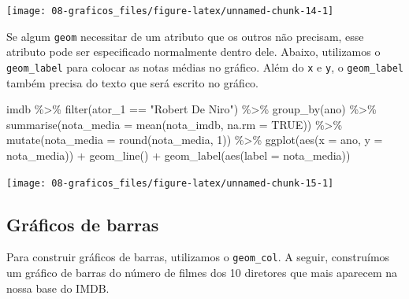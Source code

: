 \documentclass[
]{book}
\newenvironment{Shaded}{\begin{snugshade}}{\end{snugshade}}
\newcommand{\AttributeTok}[1]{\textcolor[rgb]{0.77,0.63,0.00}{#1}}
\newcommand{\ConstantTok}[1]{\textcolor[rgb]{0.00,0.00,0.00}{#1}}
\newcommand{\DecValTok}[1]{\textcolor[rgb]{0.00,0.00,0.81}{#1}}
\newcommand{\FunctionTok}[1]{\textcolor[rgb]{0.00,0.00,0.00}{#1}}
\newcommand{\NormalTok}[1]{#1}
\newcommand{\SpecialCharTok}[1]{\textcolor[rgb]{0.00,0.00,0.00}{#1}}
\newcommand{\StringTok}[1]{\textcolor[rgb]{0.31,0.60,0.02}{#1}}
\begin{document}
\begin{center}\texttt{[image: 08-graficos\_files/figure-latex/unnamed-chunk-14-1]} \end{center}

Se algum \texttt{geom} necessitar de um atributo que os outros não precisam, esse atributo pode ser especificado normalmente dentro dele. Abaixo, utilizamos o \texttt{geom\_label} para colocar as notas médias no gráfico. Além do \texttt{x} e \texttt{y}, o \texttt{geom\_label} também precisa do texto que será escrito no gráfico.

\begin{Shaded}
\begin{Highlighting}[]
\NormalTok{imdb }\SpecialCharTok{\%\textgreater{}\%} 
  \FunctionTok{filter}\NormalTok{(ator\_1 }\SpecialCharTok{==} \StringTok{"Robert De Niro"}\NormalTok{) }\SpecialCharTok{\%\textgreater{}\%} 
  \FunctionTok{group\_by}\NormalTok{(ano) }\SpecialCharTok{\%\textgreater{}\%} 
  \FunctionTok{summarise}\NormalTok{(}\AttributeTok{nota\_media =} \FunctionTok{mean}\NormalTok{(nota\_imdb, }\AttributeTok{na.rm =} \ConstantTok{TRUE}\NormalTok{)) }\SpecialCharTok{\%\textgreater{}\%} 
  \FunctionTok{mutate}\NormalTok{(}\AttributeTok{nota\_media =} \FunctionTok{round}\NormalTok{(nota\_media, }\DecValTok{1}\NormalTok{)) }\SpecialCharTok{\%\textgreater{}\%} 
  \FunctionTok{ggplot}\NormalTok{(}\FunctionTok{aes}\NormalTok{(}\AttributeTok{x =}\NormalTok{ ano, }\AttributeTok{y =}\NormalTok{ nota\_media)) }\SpecialCharTok{+}
  \FunctionTok{geom\_line}\NormalTok{() }\SpecialCharTok{+}
  \FunctionTok{geom\_label}\NormalTok{(}\FunctionTok{aes}\NormalTok{(}\AttributeTok{label =}\NormalTok{ nota\_media))}
\end{Highlighting}
\end{Shaded}

\begin{center}\texttt{[image: 08-graficos\_files/figure-latex/unnamed-chunk-15-1]} \end{center}

\hypertarget{gruxe1ficos-de-barras}{%
\subsection{Gráficos de barras}\label{gruxe1ficos-de-barras}}

Para construir gráficos de barras, utilizamos o \texttt{geom\_col}. A seguir, construímos um gráfico de barras do número de filmes dos 10 diretores que mais aparecem na nossa base do IMDB.
\end{document}
